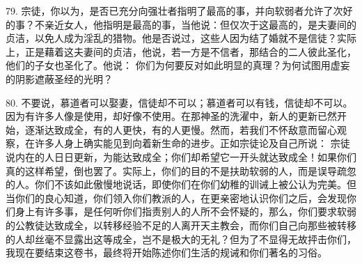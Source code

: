 79. 宗徒，你以为，是否已充分向强壮者指明了最高的事，并向软弱者允许了次好的事？不亲近女人，他指明是最高的事，当他说：但仅次于这最高的，是夫妻间的贞洁，以免人成为淫乱的猎物。他是否说过，这些人因为结了婚就不是信徒？实际上，正是藉着这夫妻间的贞洁，他说，若一方是不信者，那结合的二人彼此圣化，他们的子女也圣化了。他说：  你们为何要反对如此明显的真理？为何试图用虚妄的阴影遮蔽圣经的光明？\par

80. 不要说，慕道者可以娶妻，信徒却不可以；慕道者可以有钱，信徒却不可以。因为有许多人像是使用，却好像不使用。在那神圣的洗濯中，新人的更新已然开始，逐渐达致成全，有的人更快，有的人更慢。然而，若我们不怀敌意而留心观察，在许多人身上确实能见到向着新生命的进步。正如宗徒论及自己所说：  宗徒说内在的人日日更新，为能达致成全；你们却希望它一开头就达致成全！如果你们真的这样希望，倒也罢了。实际上，你们的目的不是扶助软弱的人，而是误导疏忽的人。你们不该如此傲慢地说话，即使你们在你们幼稚的训诫上被公认为完美。但当你们的良心知道，你们领入你们教派的人，在更亲密地认识你们之后，会发现你们身上有许多事，是任何听你们指责别人的人所不会怀疑的，那么，你们要求软弱的公教徒达致成全，以转移经验不足的人离开天主教会，而你们自己向那些被转移的人却丝毫不显露出这等成全，岂不是极大的无礼？但为了不显得无故抨击你们，我现在要结束这卷书，最终将开始陈述你们生活的规诫和你们著名的习俗。\par

